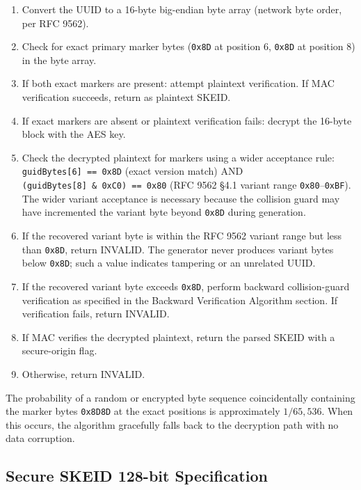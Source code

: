 \documentclass[fleqn,10pt,lineno]{wlpeerj}
\providecommand{\tightlist}{%
  \setlength{\itemsep}{0pt}\setlength{\parskip}{0pt}}
\begin{document}
\begin{enumerate}
\def\labelenumi{\arabic{enumi}.}
\tightlist
\item
  Convert the UUID to a 16-byte big-endian byte array (network byte
  order, per RFC 9562).
\item
  Check for exact primary marker bytes (\texttt{0x8D} at position 6,
  \texttt{0x8D} at position 8) in the byte array.
\item
  If both exact markers are present: attempt plaintext verification. If
  MAC verification succeeds, return as plaintext SKEID.
\item
  If exact markers are absent or plaintext verification fails: decrypt
  the 16-byte block with the AES key.
\item
  Check the decrypted plaintext for markers using a wider acceptance
  rule: \texttt{guidBytes{[}6{]}\ ==\ 0x8D} (exact version match) AND
  \texttt{(guidBytes{[}8{]}\ \&\ 0xC0)\ ==\ 0x80} (RFC 9562 §4.1 variant
  range \texttt{0x80}--\texttt{0xBF}). The wider variant acceptance is
  necessary because the collision guard may have incremented the variant
  byte beyond \texttt{0x8D} during generation.
\item
  If the recovered variant byte is within the RFC 9562 variant range but
  less than \texttt{0x8D}, return INVALID. The generator never produces
  variant bytes below \texttt{0x8D}; such a value indicates tampering or
  an unrelated UUID.
\item
  If the recovered variant byte exceeds \texttt{0x8D}, perform backward
  collision-guard verification as specified in the Backward Verification
  Algorithm section. If verification fails, return INVALID.
\item
  If MAC verifies the decrypted plaintext, return the parsed SKEID with
  a secure-origin flag.
\item
  Otherwise, return INVALID.
\end{enumerate}

The probability of a random or encrypted byte sequence coincidentally
containing the marker bytes \texttt{0x8D8D} at the exact positions is
approximately \(1/65{,}536\). When this occurs, the algorithm gracefully
falls back to the decryption path with no data corruption.

\subsection{Secure SKEID 128-bit
Specification}\label{secure-skeid-128-bit-specification}
\end{document}
